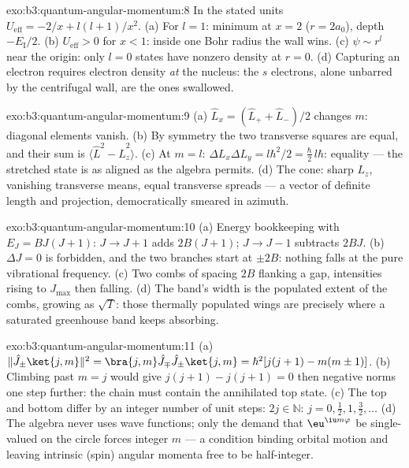 \begin{solution}{exo:b3:quantum-angular-momentum:8}
In the stated units $U_{\text{eff}} = -2/x + l(l+1)/x^2$. (a) For
$l = 1$: minimum at $x = 2$ ($r = 2a_0$), depth $-E_{\text{I}}/2$.
(b) $U_{\text{eff}} > 0$ for $x < 1$: inside one Bohr radius the
wall wins. (c) $\psi \sim r^l$ near the origin: only $l = 0$ states
have nonzero density at $r = 0$. (d) Capturing an electron requires
electron density \emph{at} the nucleus: the $s$ electrons, alone
unbarred by the centrifugal wall, are the ones swallowed.
\end{solution}

\begin{solution}{exo:b3:quantum-angular-momentum:9}
(a) $\hat L_x = (\hat L_+ + \hat L_-)/2$ changes $m$: diagonal
elements vanish. (b) By symmetry the two transverse squares are
equal, and their sum is $\langle\hat L^2 - \hat L_z^2\rangle$. (c)
At $m = l$: $\Delta L_x\Delta L_y = l\hbar^2/2 = \tfrac\hbar2
\,l\hbar$: equality --- the stretched state is as aligned as the
algebra permits. (d) The cone: sharp $L_z$, vanishing transverse
means, equal transverse spreads --- a vector of definite length and
projection, democratically smeared in azimuth.
\end{solution}

\begin{solution}{exo:b3:quantum-angular-momentum:10}
(a) Energy bookkeeping with $E_J = BJ(J+1)$: $J \to J + 1$ adds
$2B(J+1)$; $J \to J - 1$ subtracts $2BJ$. (b) $\Delta J = 0$ is
forbidden, and the two branches start at $\pm 2B$: nothing falls at
the pure vibrational frequency. (c) Two combs of spacing $2B$
flanking a gap, intensities rising to $J_{\max}$ then falling. (d)
The band's width is the populated extent of the combs, growing as
$\sqrt{T}$: those thermally populated wings are precisely where a
saturated greenhouse band keeps absorbing.
\end{solution}

\begin{solution}{exo:b3:quantum-angular-momentum:11}
(a) $\|\hat J_\pm\ket{j,m}\|^2 = \bra{j,m}\hat J_\mp\hat J_\pm
\ket{j,m} = \hbar^2[j(j+1) - m(m\pm1)]$. (b) Climbing past $m = j$
would give $j(j+1) - j(j+1) = 0$ then negative norms one step
further: the chain must contain the annihilated top state. (c) The
top and bottom differ by an integer number of unit steps: $2j \in
\mathbb N$: $j = 0, \tfrac12, 1, \tfrac32, \dots$ (d) The algebra
never uses wave functions; only the demand that
$\eu^{\iu m\varphi}$ be single-valued on the circle forces integer
$m$ --- a condition binding orbital motion and leaving intrinsic
(spin) angular momenta free to be half-integer.
\end{solution}

